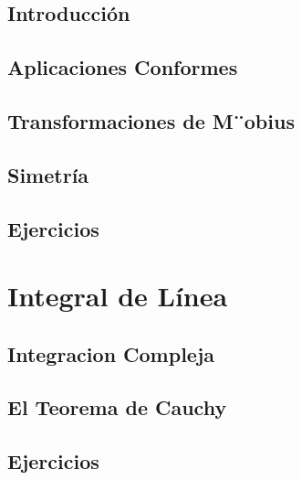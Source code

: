 \documentclass[]{book}
\begin{document}
\hypertarget{introducciuxf3n}{%
\section{Introducción}\label{introducciuxf3n}}

\hypertarget{aplicaciones-conformes-1}{%
\section{Aplicaciones Conformes}\label{aplicaciones-conformes-1}}

\hypertarget{transformaciones-de-mobius}{%
\section{Transformaciones de M¨obius}\label{transformaciones-de-mobius}}

\hypertarget{simetruxeda}{%
\section{Simetría}\label{simetruxeda}}

\hypertarget{ejercicios-2}{%
\section{Ejercicios}\label{ejercicios-2}}

\hypertarget{integral-de-luxednea}{%
\chapter{Integral de Línea}\label{integral-de-luxednea}}

\hypertarget{integracion-compleja}{%
\section{Integracion Compleja}\label{integracion-compleja}}

\hypertarget{el-teorema-de-cauchy}{%
\section{El Teorema de Cauchy}\label{el-teorema-de-cauchy}}

\hypertarget{ejercicios-3}{%
\section{Ejercicios}\label{ejercicios-3}}
\end{document}
